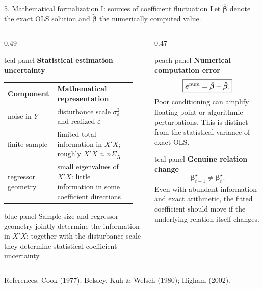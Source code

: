 \documentclass[aspectratio=169,10pt]{beamer}
\newenvironment{tealpanel}{\begin{beamercolorbox}[wd=\linewidth,sep=0.16cm,rounded=true]{teal panel}}{\end{beamercolorbox}}
\newenvironment{peachpanel}{\begin{beamercolorbox}[wd=\linewidth,sep=0.16cm,rounded=true]{peach panel}}{\end{beamercolorbox}}
\newenvironment{bluepanel}{\begin{beamercolorbox}[wd=\linewidth,sep=0.16cm,rounded=true]{blue panel}}{\end{beamercolorbox}}
\begin{document}
\begin{frame}{5. Mathematical formalization I: sources of coefficient fluctuation}
\scriptsize
Let $\hat{\bm\beta}$ denote the exact OLS solution and $\tilde{\bm\beta}$ the numerically computed value.

\begin{columns}[T,onlytextwidth]
\begin{column}{0.49\textwidth}
\begin{tealpanel}
\textbf{Statistical estimation uncertainty}

\begin{tabular}{>{\raggedright\arraybackslash}p{0.32\linewidth} p{0.60\linewidth}}
\textbf{Component} & \textbf{Mathematical representation}\\[1mm]
noise in $Y$ & disturbance scale $\sigma_\varepsilon^2$ and realized $\varepsilon$\\[1mm]
finite sample & limited total information in $X'X$; roughly $X'X\approx n\Sigma_X$\\[1mm]
regressor geometry & small eigenvalues of $X'X$: little information in some coefficient directions
\end{tabular}
\end{tealpanel}

\vspace{0.10cm}
\begin{bluepanel}
Sample size and regressor geometry jointly determine the information in $X'X$; together with the disturbance scale they determine statistical coefficient uncertainty.
\end{bluepanel}
\end{column}

\begin{column}{0.47\textwidth}
\begin{peachpanel}
\textbf{Numerical computation error}
\[
\boxed{\bm e^{\rm num}=\tilde{\bm\beta}-\hat{\bm\beta}.}
\]
Poor conditioning can amplify floating-point or algorithmic perturbations. This is distinct from the statistical variance of exact OLS.
\end{peachpanel}

\vspace{0.10cm}
\begin{tealpanel}
\textbf{Genuine relation change}
\[
\bm\beta_{t+1}^{\star}\neq\bm\beta_t^{\star}.
\]
Even with abundant information and exact arithmetic, the fitted coefficient should move if the underlying relation itself changes.
\end{tealpanel}
\end{column}
\end{columns}

\vspace{0.05cm}
{\color{textgray}\fontsize{5.2}{5.8}\selectfont References: Cook (1977); Belsley, Kuh \& Welsch (1980); Higham (2002).}
\end{frame}
\end{document}
